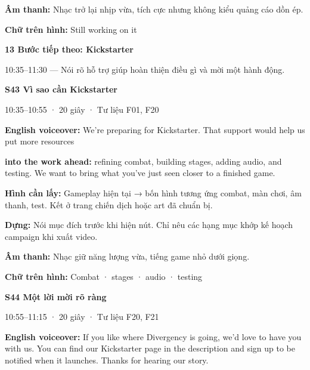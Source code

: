 \documentclass[10pt,a4paper]{article}
\begin{document}
\textbf{Âm thanh:}  Nhạc trở lại nhịp vừa, tích cực nhưng không kiểu quảng cáo dồn ép.\par

\textbf{Chữ trên hình:}  Still working on it\par

\clearpage

\textbf{13 Bước tiếp theo: Kickstarter}\par

10:35–11:30 — Nói rõ hỗ trợ giúp hoàn thiện điều gì và mời một hành động.\par

\textbf{S43 Vì sao cần Kickstarter}\par

10:35–10:55 · 20 giây · Tư liệu F01, F20\par

\textbf{English voiceover:}  We’re preparing for Kickstarter. That support would help us put more resources\par

\textbf{into the work ahead:}  refining combat, building stages, adding audio, and testing. We want to bring what you’ve just seen closer to a finished game.\par

\textbf{Hình cần lấy:}  Gameplay hiện tại → bốn hình tương ứng combat, màn chơi, âm thanh, test. Kết ở trang chiến dịch hoặc art đã chuẩn bị.\par

\textbf{Dựng:}  Nói mục đích trước khi hiện nút. Chỉ nêu các hạng mục khớp kế hoạch campaign khi xuất video.\par

\textbf{Âm thanh:}  Nhạc giữ năng lượng vừa, tiếng game nhỏ dưới giọng.\par

\textbf{Chữ trên hình:}  Combat · stages · audio · testing\par

\textbf{S44 Một lời mời rõ ràng}\par

10:55–11:15 · 20 giây · Tư liệu F20, F21\par

\textbf{English voiceover:}  If you like where Divergency is going, we’d love to have you with us. You can find our Kickstarter page in the description and sign up to be notified when it launches. Thanks for hearing our story.\par
\end{document}
